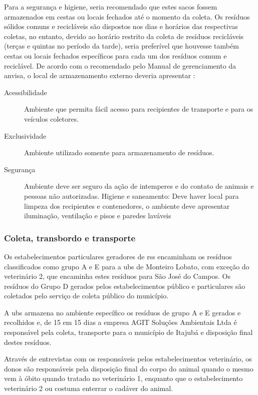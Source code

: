 	
	Para a segurança e higiene, seria recomendado que estes sacos fossem armazenados em cestas ou locais fechados até o momento da coleta. Os resíduos sólidos comuns e recicláveis são dispostos nos dias e horários das respectivas coletas, no entanto, devido ao horário restrito da coleta de resíduos recicláveis (terças e quintas no período da tarde), seria preferível que houvesse também cestas ou locais fechados específicos para cada um dos resíduos comum e reciclável.
	De acordo com o recomendado pelo Manual de gerenciamento da \gls{anvisa}, o local de armazenamento externo deveria apresentar \cite{anvisa:2006}:
	
	\begin{description}
		\item [Acessibilidade] Ambiente que permita fácil acesso para recipientes de transporte e para os veículos coletores.
		\item[Exclusividade] Ambiente utilizado somente para armazenamento de resíduos.
		\item[Segurança] Ambiente deve ser seguro da ação de intemperes e do contato de animais e pessoas não autorizadas.
		Higiene e saneamento: Deve haver local para limpeza dos recipientes e contenedores, o ambiente deve apresentar iluminação, ventilação e pisos e paredes laváveis
	\end{description}

	\subsubsection{Coleta, transbordo e transporte} 
	Os estabelecimentos particulares geradores de \gls{rss} encaminham os resíduos classificados como grupo A e E para a \gls{ubs} de Monteiro Lobato, com exceção do veterinário 2, que encaminha estes resíduos para São José do Campos. Os resíduos do Grupo D gerados pelos estabelecimentos público e particulares são coletados pelo serviço de coleta público do município.
	
	A \gls{ubs} armazena no ambiente específico os resíduos de grupo A e E gerados e recolhidos e, de 15 em 15 dias a empresa AGIT Soluções Ambientais Ltda é responsável pela coleta, transporte para o município de Itajubá e disposição final destes resíduos.
	
	Através de entrevistas com os responsáveis pelos estabelecimentos veterinário, os donos são responsáveis pela disposição final do corpo do animal quando o mesmo vem à óbito quando tratado no veterinário 1, enquanto que o estabelecimento veterinário 2 ou costuma enterrar o cadáver do animal.
	
